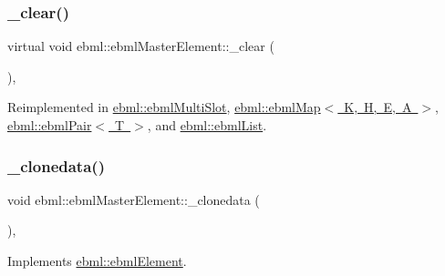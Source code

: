 \subsubsection{\texorpdfstring{\+\_\+clear()}{\_clear()}}
{\footnotesize\ttfamily virtual void ebml\+::ebml\+Master\+Element\+::\+\_\+clear (\begin{DoxyParamCaption}{ }\end{DoxyParamCaption})\hspace{0.3cm}{\ttfamily [protected]}, {\ttfamily [virtual]}}



Reimplemented in \mbox{\hyperlink{classebml_1_1ebmlMultiSlot_a0743d6fcdd75068045d53397c97dd2c3}{ebml\+::ebml\+Multi\+Slot}}, \mbox{\hyperlink{classebml_1_1ebmlMap_a3aaf6a51c0e03d5050bdefc527f9776c}{ebml\+::ebml\+Map$<$ K, H, E, A $>$}}, \mbox{\hyperlink{classebml_1_1ebmlPair_a521c8592475793acf050353ddf56031c}{ebml\+::ebml\+Pair$<$ T $>$}}, and \mbox{\hyperlink{classebml_1_1ebmlList_a2e57019d123e9647b47148c6f827cbed}{ebml\+::ebml\+List}}.

\mbox{\label{classebml_1_1ebmlMasterElement_a9bde42f70ab39592c4dccb6bf04904d4}} 
\subsubsection{\texorpdfstring{\+\_\+clonedata()}{\_clonedata()}}
{\footnotesize\ttfamily void ebml\+::ebml\+Master\+Element\+::\+\_\+clonedata (\begin{DoxyParamCaption}\item[{const \mbox{\hyperlink{classebml_1_1ebmlElement}{ebml\+Element}} $\ast$}]{ }\end{DoxyParamCaption})\hspace{0.3cm}{\ttfamily [protected]}, {\ttfamily [virtual]}}



Implements \mbox{\hyperlink{classebml_1_1ebmlElement_a3ebe3aa75b62971f385c01f27c807a02}{ebml\+::ebml\+Element}}.

\mbox{\label{classebml_1_1ebmlMasterElement_a5c076b30207aefe6f6ecc46de3b96379}} 
